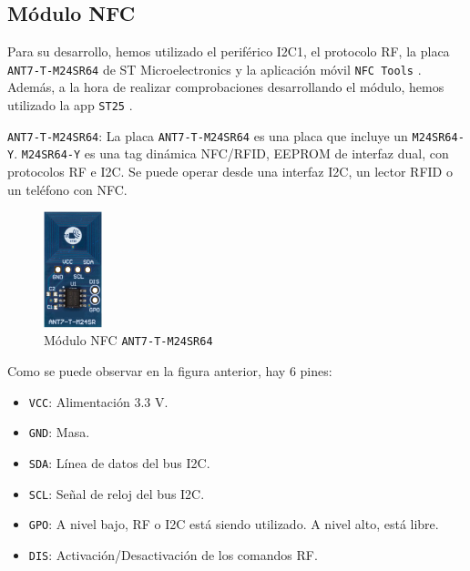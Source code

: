 \subsection{Módulo NFC}

Para su desarrollo, hemos utilizado el periférico I2C1, el protocolo RF, la placa \texttt{ANT7-T-M24SR64} \cite{M24SR64YPagWeb} de ST Microelectronics y la aplicación móvil \texttt{NFC Tools} \cite{NFCTools}. Además, a la hora de realizar comprobaciones desarrollando el módulo, hemos utilizado la app \texttt{ST25} \cite{ST25}.

\texttt{ANT7-T-M24SR64}: 
La placa \texttt{ANT7-T-M24SR64} es una placa que incluye un \texttt{M24SR64-Y}. \texttt{M24SR64-Y} es una tag dinámica NFC/RFID, EEPROM de interfaz dual, con protocolos RF e I2C. Se puede operar desde una interfaz I2C, un lector RFID o un teléfono con NFC.

\begin{figure}[h]
    \centering
    \includegraphics[width=0.15\textwidth]{images/2/2-5/M24SR.png}
    \caption{Módulo NFC \texttt{ANT7-T-M24SR64}}
    \label{fig:2-5-modulo-nfc}
\end{figure}

Como se puede observar en la figura anterior, hay 6 pines:

\begin{itemize}
    \item \texttt{VCC}: Alimentación 3.3 V.
    \item \texttt{GND}: Masa.
    \item \texttt{SDA}: Línea de datos del bus I2C.
    \item \texttt{SCL}: Señal de reloj del bus I2C.
    \item \texttt{GPO}: A nivel bajo, RF o I2C está siendo utilizado. A nivel alto, está libre.
    \item \texttt{DIS}: Activación/Desactivación de los comandos RF.
\end{itemize}
